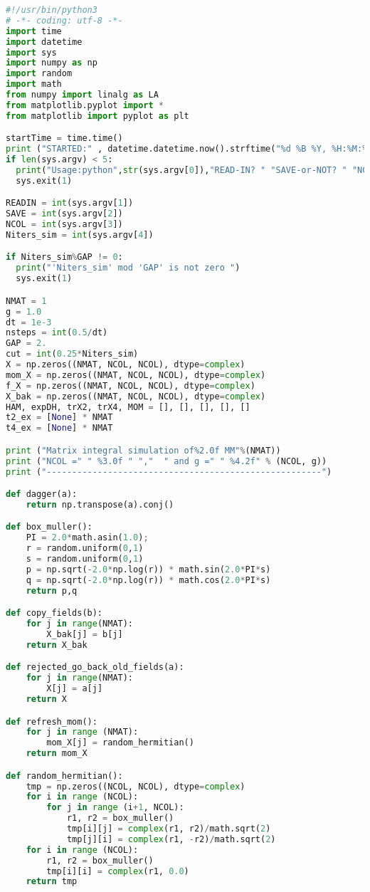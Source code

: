 \begin{lstlisting}[language=Python]
#!/usr/bin/python3
# -*- coding: utf-8 -*-
import time 
import datetime 
import sys
import numpy as np
import random
import math
from numpy import linalg as LA
from matplotlib.pyplot import *
from matplotlib import pyplot as plt

startTime = time.time()
print ("STARTED:" , datetime.datetime.now().strftime("%d %B %Y, %H:%M:%S"))
if len(sys.argv) < 5:
  print("Usage:python",str(sys.argv[0]),"READ-IN? " "SAVE-or-NOT? " "NCOL " "NITERS")
  sys.exit(1)

READIN = int(sys.argv[1])
SAVE = int(sys.argv[2])
NCOL = int(sys.argv[3]) 
Niters_sim = int(sys.argv[4])

if Niters_sim%GAP != 0:
  print("'Niters_sim' mod 'GAP' is not zero ")
  sys.exit(1) 

NMAT = 1
g = 1.0
dt = 1e-3
nsteps = int(0.5/dt) 
GAP = 2.
cut = int(0.25*Niters_sim) 
X = np.zeros((NMAT, NCOL, NCOL), dtype=complex)
mom_X = np.zeros((NMAT, NCOL, NCOL), dtype=complex)
f_X = np.zeros((NMAT, NCOL, NCOL), dtype=complex)
X_bak = np.zeros((NMAT, NCOL, NCOL), dtype=complex)
HAM, expDH, trX2, trX4, MOM = [], [], [], [], []
t2_ex = [None] * NMAT
t4_ex = [None] * NMAT

print ("Matrix integral simulation of%2.0f MM"%(NMAT)) 
print ("NCOL =" " %3.0f " ","  " and g =" " %4.2f" % (NCOL, g)) 
print ("------------------------------------------------------")

def dagger(a):
    return np.transpose(a).conj()

def box_muller():  
    PI = 2.0*math.asin(1.0);    
    r = random.uniform(0,1)
    s = random.uniform(0,1)
    p = np.sqrt(-2.0*np.log(r)) * math.sin(2.0*PI*s)
    q = np.sqrt(-2.0*np.log(r)) * math.cos(2.0*PI*s)
    return p,q

def copy_fields(b):
    for j in range(NMAT):
        X_bak[j] = b[j]
    return X_bak

def rejected_go_back_old_fields(a):
    for j in range(NMAT):
        X[j] = a[j]
    return X

def refresh_mom():
    for j in range (NMAT):
        mom_X[j] = random_hermitian()
    return mom_X

def random_hermitian():
    tmp = np.zeros((NCOL, NCOL), dtype=complex)
    for i in range (NCOL):
        for j in range (i+1, NCOL):
            r1, r2 = box_muller()
            tmp[i][j] = complex(r1, r2)/math.sqrt(2)
            tmp[j][i] = complex(r1, -r2)/math.sqrt(2)
    for i in range (NCOL):
        r1, r2 = box_muller()
        tmp[i][i] = complex(r1, 0.0) 
    return tmp



\end{lstlisting}
